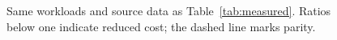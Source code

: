 \begin{figure}[t]
  \centering
  
  \caption{Same workloads and source data as Table~\ref{tab:measured}.
  Ratios below one indicate reduced cost; the dashed line marks parity.}
  \label{fig:cost}
\end{figure}
